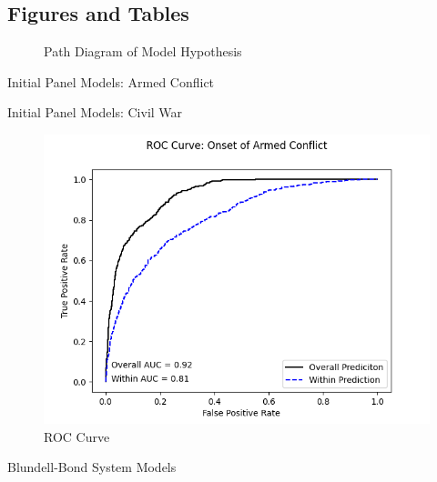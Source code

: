 \begin{appendix}
    \section{Figures and Tables}
    

    \clearpage
    \newpage

    \begin{figure}[!h]
        \caption{Path Diagram of Model Hypothesis}
        \centering
        
        \label{path}
    \end{figure}

    \clearpage
    \newpage

    \begin{table}[!h]
        \caption{Initial Panel Models: Armed Conflict}
        \centering
        
        \label{tab::armed}
    \end{table}

    \begin{table}[!h]
        \caption{Initial Panel Models: Civil War}
        \centering
        
        \label{tab::civil}
    \end{table}

    \begin{figure}[!h]
        \centering
        \includegraphics{ROC_FE.png}
        \caption{ROC Curve}
        \label{rocfe}
    \end{figure}

    \begin{table}[!h]
        \caption{Blundell-Bond System Models}
        \begin{minipage}{.5\linewidth}
          
        \end{minipage}%
        \begin{minipage}{.5\linewidth}
            
        \end{minipage}
        \label{gmm_mods}
    \end{table}


\end{appendix}
